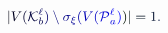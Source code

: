 \documentclass[12pt]{article}
\begin{document}
\makeatletter
\renewcommand*{\@textcolor}[3]{%
  \protect\leavevmode
  \begingroup
    \color#1{#2}#3%
  \endgroup
}
\makeatother
\begin{displaymath}
\mathcolor[RGB]{0,0,15}{|} \mathcolor[RGB]{0,0,30}{V} \mathcolor[RGB]{0,0,45}{(} \mathcal { \mathcolor[RGB]{0,0,60}{K} } _ { \mathcolor[RGB]{0,0,75}{b} } ^ { \mathcolor[RGB]{0,0,90}{\ell} } \mathcolor[RGB]{0,0,105}{)} \mathcolor[RGB]{0,0,120}{\setminus} \mathcolor[RGB]{0,0,135}{\sigma} _ { \mathcolor[RGB]{0,0,150}{\xi} } \mathcolor[RGB]{0,0,165}{(} \mathcolor[RGB]{0,0,180}{V} \mathcolor[RGB]{0,0,195}{(} \mathcal { \mathcolor[RGB]{0,0,210}{P} } _ { \mathcolor[RGB]{0,0,225}{a} } ^ { \mathcolor[RGB]{0,0,240}{\ell} } \mathcolor[RGB]{0,0,255}{)} \mathcolor[RGB]{0,15,0}{)} \mathcolor[RGB]{0,15,15}{|} \mathcolor[RGB]{0,15,30}{=} \mathcolor[RGB]{0,15,45}{1} \mathcolor[RGB]{0,15,60}{.}
\end{displaymath}
\end{document}
